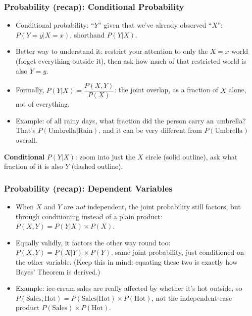 \begin{frame}[fragile]\frametitle{Probability (recap): Conditional Probability}
\begin{itemize}
\item Conditional probability: ``$Y$'' given that we've already observed ``$X$'': $P(Y=y|X=x)$, shorthand $P(Y|X)$.
\item Better way to understand it: restrict your attention to only the $X=x$ world (forget everything outside it), then ask how much of that restricted world is also $Y=y$.
\item Formally, $P(Y|X) = \dfrac{P(X,Y)}{P(X)}$: the joint overlap, as a fraction of $X$ alone, not of everything.
\item Example: of all rainy days, what fraction did the person carry an umbrella? That's $P(\text{Umbrella}|\text{Rain})$, and it can be very different from $P(\text{Umbrella})$ overall.
\end{itemize}
\begin{center}

{\footnotesize \textbf{Conditional} $P(Y|X)$: zoom into just the $X$ circle (solid outline), ask what fraction of it is also $Y$ (dashed outline).}
\end{center}
\end{frame}

\begin{frame}[fragile]\frametitle{Probability (recap): Dependent Variables}
\begin{itemize}
\item When $X$ and $Y$ are \emph{not} independent, the joint probability still factors, but through conditioning instead of a plain product: $P(X,Y) = P(Y|X) \times P(X)$.
\item Equally validly, it factors the other way round too: $P(X,Y) = P(X|Y) \times P(Y)$, same joint probability, just conditioned on the other variable. (Keep this in mind: equating these two is exactly how Bayes' Theorem is derived.)
\item Example: ice-cream sales are really affected by whether it's hot outside, so $P(\text{Sales}, \text{Hot}) = P(\text{Sales}|\text{Hot}) \times P(\text{Hot})$, not the independent-case product $P(\text{Sales})\times P(\text{Hot})$.
\end{itemize}
\end{frame}

